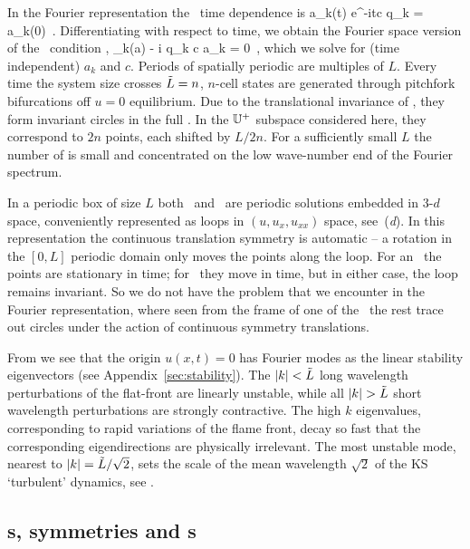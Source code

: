 In the Fourier representation the \reqva\ time dependence is
\beq
 a_k(t) e^{-itc q_k} = a_k(0)
\,.
Differentiating with respect to time, we obtain
the Fourier space version of the \reqv\ condition
,
\beq
 \pVeloc_k(a) - i q_k c a_k = 0
\,,
which we solve for (time independent) $a_k$ and $c$.
Periods of spatially periodic {\eqva} are multiples of $L$.
Every time the system size crosses  $\tilde{L}=n$,
$n$-cell states
are generated through pitchfork bifurcations off $u =0$
equilibrium.
Due to the translational invariance of {\KSe},
they form invariant circles
in the full \statesp.
In the $\mathbb{U}^+$ subspace considered here,
they correspond to $2n$ points, each shifted by $L/2n$.
For a sufficiently small $L$
the number of {\eqva} is small and
concentrated on the low wave-number end of the Fourier spectrum.

In a periodic box of size $L$
both \eqva\ and \reqva\ are  periodic solutions
embedded in 3-$d$ space, conveniently represented as loops in
$(u,u_x,u_{xx})$ space, see \,(\textit{d}).
In this representation the continuous translation symmetry
is automatic -- a rotation in the $[0,L]$ periodic domain only
moves the points along the loop. For an \eqv\ the points
are stationary in time; for \reqv\ they move in time, but in
either case, the loop remains invariant.
So we do not have the problem that we encounter in the Fourier
representation, where seen from the frame of one of the \eqva\
the rest trace out circles under the action of continuous symmetry
translations.

From  we see that the origin $u(x,t) = 0$
has Fourier modes as the linear stability eigenvectors
(see Appendix~\ref{sec:stability}).  The $|k|<\tilde{L}$
long wavelength perturbations of the flat-front {\eqv}
are linearly unstable, while all
$|k|> \tildeL$ short wavelength perturbations are strongly contractive.
The high $k$ eigenvalues, corresponding to rapid variations of
the flame front, decay so fast that the corresponding eigendirections
are physically irrelevant.
The most unstable mode, nearest to $|k|=\tilde{L}/\sqrt{2}$,
sets the scale of the mean wavelength $\sqrt{2}$
of the KS `turbulent' dynamics,
see .


\subsection{\Rpo s, symmetries and \po s} \label{sec:KSePO}

